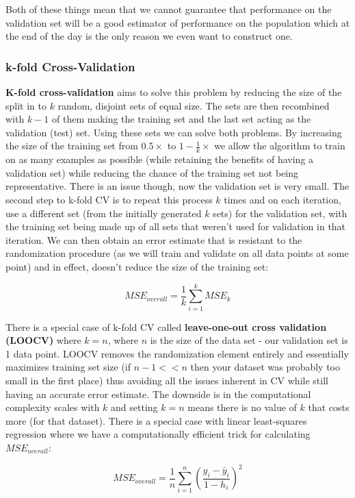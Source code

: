 Both of these things mean that we cannot guarantee that performance on the validation set will be a good estimator of performance on the population which at the end of the day is the only reason we even want to construct one.

\subsubsection{k-fold Cross-Validation}

\textbf{K-fold cross-validation} aims to solve this problem by reducing the size of the split in to $k$ random, disjoint sets of equal size. The sets are then recombined with $k-1$ of them making the training set and the last set acting as the validation (test) set. Using these sets we can solve both problems. By increasing the size of the training set from $0.5\times$ to $1-\frac{1}{k}\times$ we allow the algorithm to train on as many examples as possible (while retaining the benefits of having a validation set) while reducing the chance of the training set not being representative. There is an issue though, now the validation set is very small. The second step to k-fold CV is to repeat this process $k$ times and on each iteration, use a different set (from the initially generated $k$ sets) for the validation set, with the training set being made up of all sets that weren't used for validation in that iteration. We can then obtain an error estimate that is resistant to the randomization procedure (as we will train and validate on all data points at some point) and in effect, doesn't reduce the size of the training set:

$$ MSE_{overall} = \frac{1}{k}\sum_{i=1}^{k} MSE_{k} $$

There is a special case of k-fold CV called \textbf{leave-one-out cross validation (LOOCV)} where $k=n$, where $n$ is the size of the data set - our validation set is 1 data point. LOOCV removes the randomization element entirely and essentially maximizes training set size (if $n-1<<n$ then your dataset was probably too small in the first place) thus avoiding all the issues inherent in CV while still having an accurate error estimate. The downside is in the computational complexity scales with $k$ and setting $k=n$ means there is no value of $k$ that costs more (for that dataset). There is a special case with linear least-squares regression where we have a computationally efficient trick for calculating $MSE_{overall}$:

$$ MSE_{overall} = \frac{1}{n}\sum^{n}_{i=1} \left( \frac{y_{i}-\bar{y}_{i}}{1-h_{i}} \right)^{2} $$


